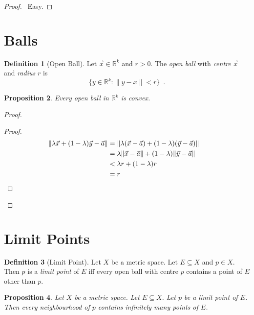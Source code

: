 \documentclass{book}
\let\qed\relax
\newtheorem{prop}{Proposition}[chapter]
\theoremstyle{definition}
\newtheorem{df}[prop]{Definition}
\begin{document}
\begin{proof}
\pf\ Easy. \qed
\end{proof}

\section{Balls}

\begin{df}[Open Ball]
Let $\vec{x} \in \mathbb{R}^k$ and $r > 0$. The \emph{open ball} with \emph{centre} $\vec{x}$ and \emph{radius} $r$ is
\[ \{ y \in \mathbb{R}^k : \| y - x \| < r \} \enspace . \]
\end{df}

\begin{prop}
Every open ball in $\mathbb{R}^k$ is convex.
\end{prop}

\begin{proof}
\pf
{}
\begin{proof}
\pf
\begin{align*}
\| \lambda \vec{x} + (1 - \lambda) \vec{y} - \vec{a} \|
& = \| \lambda (\vec{x} - \vec{a}) + (1 - \lambda) (\vec{y} - \vec{a}) \| \\
& = \lambda \| \vec{x} - \vec{a} \| + (1 - \lambda) \| \vec{y} - \vec{a} \| \\
& < \lambda r + (1 - \lambda) r \\
& = r & \qed
\end{align*}
\end{proof}
\qed
\end{proof}

\section{Limit Points}

\begin{df}[Limit Point]
Let $X$ be a metric space. Let $E \subseteq X$ and $p \in X$. Then $p$ is a \emph{limit point} of $E$ iff every open ball with centre $p$ contains a point of $E$ other than $p$.
\end{df}

\begin{prop}
Let $X$ be a metric space. Let $E \subseteq X$. Let $p$ be a limit point of $E$. Then every neighbourhood of $p$ contains infinitely many points of $E$.
\end{prop}
\end{document}
